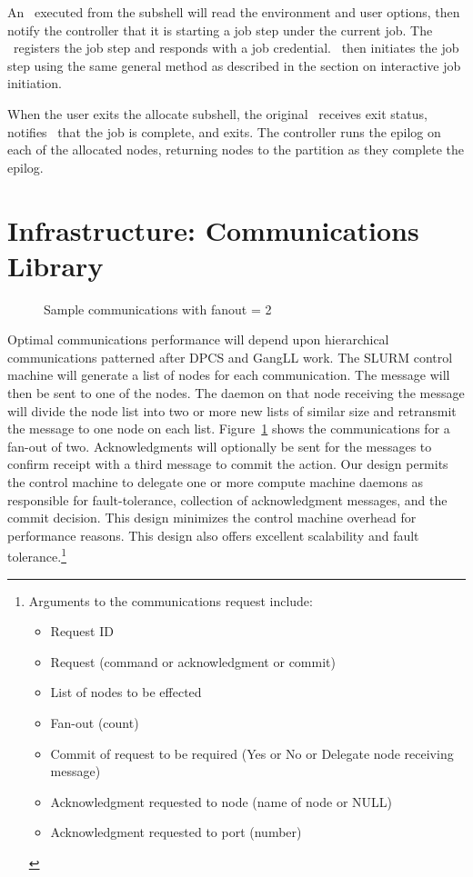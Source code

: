 An \srun\ executed from the subshell will read the environment and
user options, then notify the controller that it is starting a job step
under the current job. The \slurmctld\ registers the job step and responds
with a job credential. \srun\ then initiates the job step using the same
general method as described in the section on interactive job initiation.

When the user exits the allocate subshell, the original \srun\ receives
exit status, notifies \slurmctld\ that the job is complete, and exits. 
The controller runs the epilog on each of the allocated nodes, returning
nodes to the partition as they complete the epilog.


\section{Infrastructure: Communications Library}

\begin{figure}[htb]
\centerline{}
\caption{Sample communications with fanout = 2}
\label{communicate}
\end{figure}
Optimal communications performance will depend upon hierarchical communications
patterned after DPCS and GangLL work. The SLURM control machine will generate a
list of nodes for each communication. The message will then be sent to one of
the nodes. 
The daemon on that node receiving the message will divide the node list into
two or more new lists of similar size and retransmit the message to one node on
each list. Figure~\ref{communicate} shows the communications for a fan-out of 
two.  Acknowledgments will optionally be sent for the messages to confirm 
receipt with a third message to commit the action. Our design permits the 
control machine to delegate one or more compute machine daemons as responsible 
for fault-tolerance, collection of acknowledgment messages, and the commit
decision. This design minimizes the control machine overhead for performance
reasons. This design also offers excellent scalability and fault 
tolerance.\footnote{Arguments to the communications request include:
\begin{itemize}
\item Request ID
\item Request (command or acknowledgment or commit)
\item List of nodes to be effected
\item Fan-out (count)
\item Commit of request to be required (Yes or No or Delegate node receiving
      message) 
\item Acknowledgment requested to node (name of node or NULL)
\item Acknowledgment requested to port (number)
\end{itemize} }

